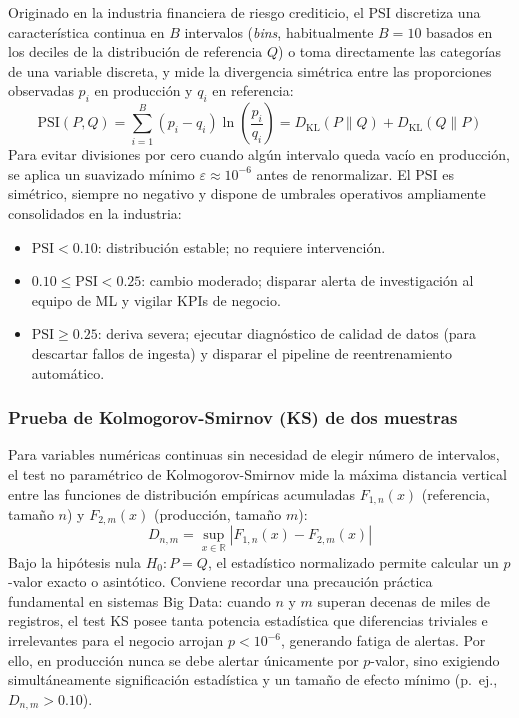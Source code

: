 Originado en la industria financiera de riesgo crediticio, el PSI discretiza una característica continua en $B$ intervalos (\textit{bins}, habitualmente $B=10$ basados en los deciles de la distribución de referencia $Q$) o toma directamente las categorías de una variable discreta, y mide la divergencia simétrica entre las proporciones observadas $p_i$ en producción y $q_i$ en referencia:
\begin{equation}\label{eq:psi}
\text{PSI}(P, Q) = \sum_{i=1}^{B} (p_i - q_i) \ln\left(\frac{p_i}{q_i}\right) = D_{\text{KL}}(P \parallel Q) + D_{\text{KL}}(Q \parallel P)
\end{equation}
Para evitar divisiones por cero cuando algún intervalo queda vacío en producción, se aplica un suavizado mínimo $\varepsilon \approx 10^{-6}$ antes de renormalizar. El PSI es simétrico, siempre no negativo y dispone de umbrales operativos ampliamente consolidados en la industria:
\begin{itemize}
  \item $\text{PSI} < 0.10$: distribución estable; no requiere intervención.
  \item $0.10 \le \text{PSI} < 0.25$: cambio moderado; disparar alerta de investigación al equipo de ML y vigilar KPIs de negocio.
  \item $\text{PSI} \ge 0.25$: deriva severa; ejecutar diagnóstico de calidad de datos (para descartar fallos de ingesta) y disparar el pipeline de reentrenamiento automático.
\end{itemize}

\subsubsection{Prueba de Kolmogorov-Smirnov (KS) de dos muestras}

Para variables numéricas continuas sin necesidad de elegir número de intervalos, el test no paramétrico de Kolmogorov-Smirnov mide la máxima distancia vertical entre las funciones de distribución empíricas acumuladas $F_{1,n}(x)$ (referencia, tamaño $n$) y $F_{2,m}(x)$ (producción, tamaño $m$):
\begin{equation}\label{eq:ks}
D_{n,m} = \sup_{x \in \mathbb{R}} \left| F_{1,n}(x) - F_{2,m}(x) \right|
\end{equation}
Bajo la hipótesis nula $H_0: P = Q$, el estadístico normalizado permite calcular un $p$-valor exacto o asintótico. Conviene recordar una precaución práctica fundamental en sistemas Big Data: cuando $n$ y $m$ superan decenas de miles de registros, el test KS posee tanta potencia estadística que diferencias triviales e irrelevantes para el negocio arrojan $p < 10^{-6}$, generando fatiga de alertas. Por ello, en producción nunca se debe alertar únicamente por $p$-valor, sino exigiendo simultáneamente significación estadística y un tamaño de efecto mínimo (p.~ej., $D_{n,m} > 0.10$).

